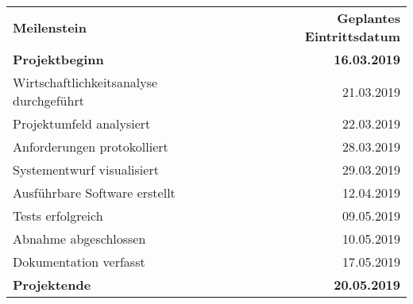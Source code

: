 \begin{tabular}{lr}
\rowcolor{KVGruen}\textbf{Meilenstein} & \textbf{Geplantes Eintrittsdatum} \\
\textbf{Projektbeginn} & \textbf{16.03.2019} \\
\rowcolor{KVGrau}Wirtschaftlichkeitsanalyse durchgeführt & 21.03.2019 \\
Projektumfeld analysiert & 22.03.2019 \\
\rowcolor{KVGrau}Anforderungen protokolliert & 28.03.2019 \\
Systementwurf visualisiert & 29.03.2019 \\
\rowcolor{KVGrau}Ausführbare Software erstellt & 12.04.2019 \\
Tests erfolgreich & 09.05.2019 \\
\rowcolor{KVGrau}Abnahme abgeschlossen & 10.05.2019 \\
Dokumentation verfasst & 17.05.2019 \\
\rowcolor{KVGrau}\textbf{Projektende} & \textbf{20.05.2019} \\
\end{tabular}

